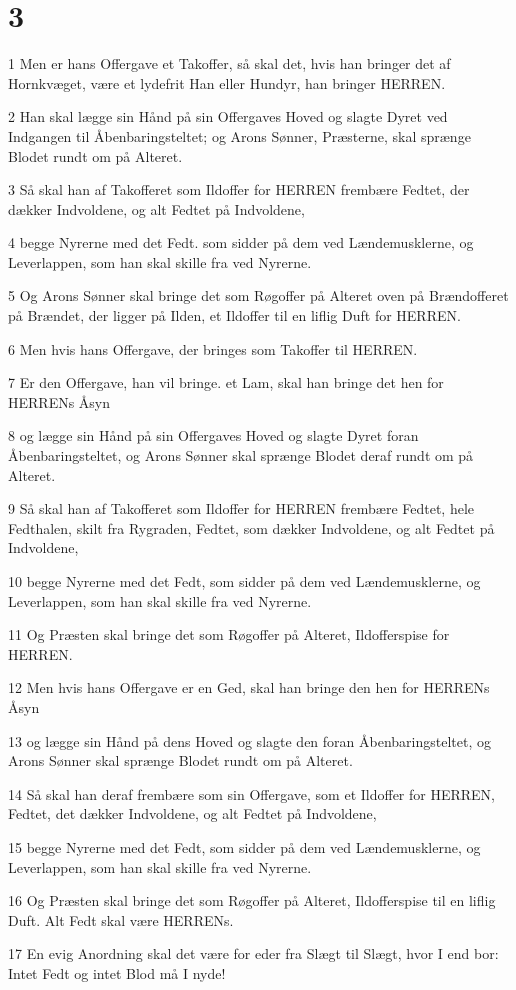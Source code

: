 \chapter{3}

\par 1 Men er hans Offergave et Takoffer, så skal det, hvis han bringer det af Hornkvæget, være et lydefrit Han eller Hundyr, han bringer HERREN.
\par 2 Han skal lægge sin Hånd på sin Offergaves Hoved og slagte Dyret ved Indgangen til Åbenbaringsteltet; og Arons Sønner, Præsterne, skal sprænge Blodet rundt om på Alteret.
\par 3 Så skal han af Takofferet som Ildoffer for HERREN frembære Fedtet, der dækker Indvoldene, og alt Fedtet på Indvoldene,
\par 4 begge Nyrerne med det Fedt. som sidder på dem ved Lændemusklerne, og Leverlappen, som han skal skille fra ved Nyrerne.
\par 5 Og Arons Sønner skal bringe det som Røgoffer på Alteret oven på Brændofferet på Brændet, der ligger på Ilden, et Ildoffer til en liflig Duft for HERREN.
\par 6 Men hvis hans Offergave, der bringes som Takoffer til HERREN.
\par 7 Er den Offergave, han vil bringe. et Lam, skal han bringe det hen for HERRENs Åsyn
\par 8 og lægge sin Hånd på sin Offergaves Hoved og slagte Dyret foran Åbenbaringsteltet, og Arons Sønner skal sprænge Blodet deraf rundt om på Alteret.
\par 9 Så skal han af Takofferet som Ildoffer for HERREN frembære Fedtet, hele Fedthalen, skilt fra Rygraden, Fedtet, som dækker Indvoldene, og alt Fedtet på Indvoldene,
\par 10 begge Nyrerne med det Fedt, som sidder på dem ved Lændemusklerne, og Leverlappen, som han skal skille fra ved Nyrerne.
\par 11 Og Præsten skal bringe det som Røgoffer på Alteret, Ildofferspise for HERREN.
\par 12 Men hvis hans Offergave er en Ged, skal han bringe den hen for HERRENs Åsyn
\par 13 og lægge sin Hånd på dens Hoved og slagte den foran Åbenbaringsteltet, og Arons Sønner skal sprænge Blodet rundt om på Alteret.
\par 14 Så skal han deraf frembære som sin Offergave, som et Ildoffer for HERREN, Fedtet, det dækker Indvoldene, og alt Fedtet på Indvoldene,
\par 15 begge Nyrerne med det Fedt, som sidder på dem ved Lændemusklerne, og Leverlappen, som han skal skille fra ved Nyrerne.
\par 16 Og Præsten skal bringe det som Røgoffer på Alteret, Ildofferspise til en liflig Duft. Alt Fedt skal være HERRENs.
\par 17 En evig Anordning skal det være for eder fra Slægt til Slægt, hvor I end bor: Intet Fedt og intet Blod må I nyde!

